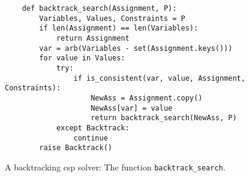 \begin{figure}[!ht]
\centering
\begin{verbatim}
    def backtrack_search(Assignment, P):
        Variables, Values, Constraints = P
        if len(Assignment) == len(Variables):
            return Assignment
        var = arb(Variables - set(Assignment.keys()))
        for value in Values:
            try:
                if is_consistent(var, value, Assignment, Constraints):
                    NewAss = Assignment.copy()
                    NewAss[var] = value
                    return backtrack_search(NewAss, P)
            except Backtrack:
                continue
        raise Backtrack()  
\end{verbatim}
\vspace*{-0.3cm}
\caption{A backtracking \ac{csp} solver: The function \texttt{backtrack\_search}.}
\label{fig:Backtrack-Solver.ipynb:backtrack_search}
\end{figure}

